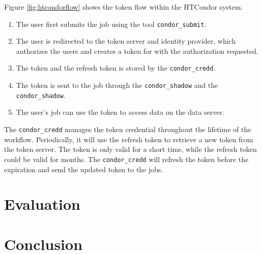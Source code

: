 \documentclass{webofc}
\begin{document}
\noindent
Figure \ref{fig:htcondorflow} shows the token flow within the HTCondor system.

\begin{enumerate}
    \item The user first submits the job using the tool \texttt{condor\_submit}.
    \item The user is redirected to the token server and identity provider, which authorizes the users and creates a token for with the authorization requested.
    \item The token and the refresh token is stored by the \texttt{condor\_credd}.  
    \item The token is sent to the job through the \texttt{condor\_shadow} and the \texttt{condor\_shadow}.
    \item The user's job can use the token to access data on the data server.
\end{enumerate}

The \texttt{condor\_credd} manages the token credential throughout the lifetime of the workflow.  Periodically, it will use the refresh token to retrieve a new token from the token server.  The token is only valid for a short time, while the refresh token could be valid for months.  The \texttt{condor\_credd} will refresh the token before the expiration and send the updated token to the jobs.



\section{Evaluation}
\label{sec:eval}

\section{Conclusion}
\label{sec:conclusion}



%

\end{document}
